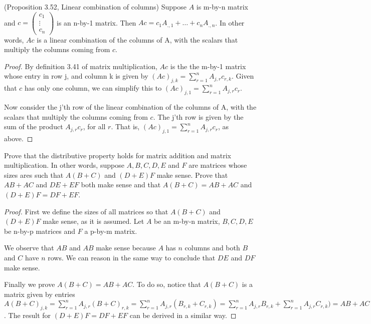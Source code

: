 \begin{exercise}{9}
 (Proposition 3.52, Linear combination of columns) Suppose $A$ is m-by-n matrix and $c = \begin{pmatrix}c_{1}\\ \vdots\\ c_{n}\end{pmatrix}$ is an n-by-1 matrix. Then $Ac = c_{1}A_{.,1} + \dots + c_{n}A_{.,n}$. In other words, $Ac$ is a linear combination of the columns of A, with the scalars that multiply the columns coming from $c$.
\end{exercise}
\begin{proof}
 By definition 3.41 of matrix multiplication, $Ac$ is the the m-by-1 matrix whose entry in row j, and column k is given by $(Ac)_{j,k} = \sum_{r=1}^{n}A_{j,r}c_{r,k}$. Given that $c$ has only one column, we can simplify this to $(Ac)_{j,1} = \sum_{r=1}^{n}A_{j,r}c_{r}$. 
 
 Now consider the j'th row of the linear combination of the columns of A, with the scalars that multiply the columns coming from $c$. The j'th row is given by the sum of the product $A_{j,r}c_{r}$, for all $r$. That is, $(Ac)_{j,1} = \sum_{r=1}^{n}A_{j,r}c_{r}$, as above.
\end{proof}


\begin{exercise}{13}
  Prove that the distributive property holds for matrix addition and matrix multiplication. In other words, suppose $A,B,C,D,E$ and $F$ are matrices whose sizes ares such that $A(B+C)$ and $(D+E)F$ make sense. Prove that $AB+AC$ and $DE+EF$ both make sense and that $A(B+C)=AB+AC$ and $(D+E)F=DF+EF$.
\end{exercise}
\begin{proof}
 First we define the sizes of all matrices so that $A(B+C)$ and $(D+E)F$ make sense, as it is assumed. Let $A$ be an m-by-n matrix, $B,C,D,E$ be n-by-p matrices and $F$ a p-by-m matrix.
 
 We observe that $AB$ and $AB$ make sense because $A$ has $n$ columns and both $B$ and $C$ have $n$ rows. We can reason in the same way to conclude that $DE$ and $DF$ make sense.
 
 Finally we prove $A(B+C)=AB+AC$. To do so, notice that $A(B+C)$ is a matrix given by entries $A(B+C)_{j,k} = \sum_{r=1}^{n}A_{j,r}(B+C)_{r,k} = \sum_{r=1}^{n}A_{j,r}(B_{r,k}+C_{r,k}) = \sum_{r=1}^{n}A_{j,r}B_{r,k}+\sum_{r=1}^{n}A_{j,r}C_{r,k}) = AB+AC$. The result for $(D+E)F=DF+EF$ can be derived in a similar way.
\end{proof}


